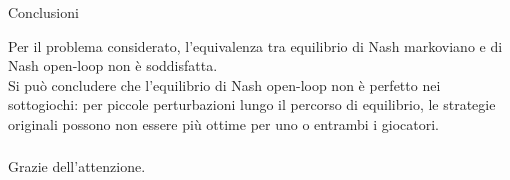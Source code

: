 \documentclass{beamer}
\theoremstyle{plain}
\theoremstyle{definition}
\begin{document}
\begin{frame}{Conclusioni}


Per il problema considerato, l'equivalenza tra equilibrio di Nash markoviano e di Nash open-loop non è soddisfatta. \\

\bigskip 
Si può concludere che l'equilibrio di Nash open-loop non è perfetto nei sottogiochi: per piccole perturbazioni lungo il percorso di equilibrio, le strategie originali possono non essere più ottime per uno o entrambi i giocatori.
    
\end{frame}

\begin{frame}
\frametitle{\;}
\begin{center}
\Large
Grazie dell'attenzione. 
\end{center}
\end{frame}
\end{document}
